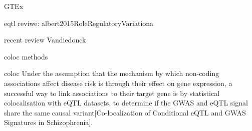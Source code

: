 \begin{outline}

    GTEx

    \1 eqtl reviwe: albert2015RoleRegulatoryVariationa

    recent review
    Vandiedonck

\1 coloc methods

    \2 coloc
        \3 Under the assumption that the mechanism by which non-coding associations affect disease risk is through their effect on gene expression, a successful way to link associations to their target gene is by statistical colocalisation with eQTL datasets, to determine if the GWAS and eQTL signal share the same causal variant[Co-localization of Conditional eQTL and GWAS Signatures in Schizophrenia].


\end{outline}
